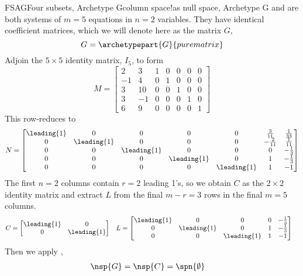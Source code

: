 \begin{example}{FSAG}{Four subsets, Archetype G}{column space!as null space, Archetype G}
%
 and  are both systems of $m=5$ equations in $n=2$ variables.  They have identical coefficient matrices, which we will denote here as the matrix $G$,
%
\begin{equation*}
G=
\archetypepart{G}{purematrix}
\end{equation*}
%
Adjoin the $5\times 5$ identity matrix, $I_5$, to form
%
\begin{equation*}
M=
\begin{bmatrix}
2 & 3 & 1&0&0&0&0\\
-1 & 4 & 0&1&0&0&0\\
3 & 10 & 0&0&1&0&0\\
3 &  -1 & 0&0&0&1&0\\
6 & 9 & 0&0&0&0&1
\end{bmatrix}
\end{equation*}
%
This row-reduces to
%
\begin{equation*}
N=
\begin{bmatrix}
\leading{1} & 0 & 0 & 0 & 0 & \frac{3}{11} & \frac{1}{33}\\
0 & \leading{1} & 0 & 0 & 0 & -\frac{2}{11} & \frac{1}{11}\\
0 & 0 & \leading{1} & 0 & 0 & 0 & -\frac{1}{3}\\
0 & 0 & 0 & \leading{1} & 0 & 1 & -\frac{1}{3}\\
0 & 0 & 0 & 0 & \leading{1} & 1 & -1
\end{bmatrix}
\end{equation*}
%
The first $n=2$ columns contain $r=2$ leading 1's, so we obtain $C$ as the $2\times 2$ identity matrix and extract $L$ from the final $m-r=3$ rows in the final $m=5$ columns.
%
\begin{align*}
C&=
\begin{bmatrix}
\leading{1} & 0\\
0 & \leading{1}
\end{bmatrix}
&
L&=
\begin{bmatrix}
\leading{1} & 0 & 0 & 0 & -\frac{1}{3}\\
0 & \leading{1}  & 0 & 1 & -\frac{1}{3}\\
0 & 0 & \leading{1}  & 1 & -1
\end{bmatrix}
\end{align*}
%
Then we apply ,
%
\begin{align*}
\nsp{G}=\nsp{C}&=
\spn{\emptyset}

\end{align*}
\end{example}
